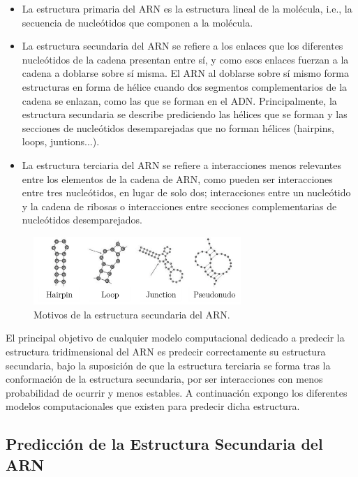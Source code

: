 \documentclass[a4paper,11pt,titlepage]{article}
\theoremstyle{definition}
\begin{document}
\begin{itemize}
    \item La estructura primaria del ARN es la estructura lineal de la molécula, i.e., la secuencia de nucleótidos que componen a la molécula.
    \item La estructura secundaria del ARN se refiere a los enlaces que los diferentes nucleótidos de la cadena presentan entre sí, y como esos enlaces fuerzan a la cadena a doblarse sobre sí misma. El ARN al doblarse sobre sí mismo forma estructuras en forma de hélice cuando dos segmentos complementarios de la cadena se enlazan, como las que se forman en el ADN. Principalmente, la estructura secundaria se describe prediciendo las hélices que se forman y las secciones de nucleótidos desemparejadas que no forman hélices (hairpins, loops, juntions...).
    \item La estructura terciaria del ARN se refiere a interacciones menos relevantes entre los elementos de la cadena de ARN, como pueden ser interacciones entre tres nucleótidos, en lugar de solo dos; interacciones entre un nucleótido y la cadena de ribosas o interacciones entre secciones complementarias de nucleótidos desemparejados.
\end{itemize}

\begin{figure}[H]
    \centering
    \includegraphics[width=0.70\textwidth]{images/RNA_secondary_structure.png}
    \small{\caption{Motivos de la estructura secundaria del ARN.}\label{fig:RNA_secondary_structure}}\normalsize
\end{figure}

El principal objetivo de cualquier modelo computacional dedicado a predecir la estructura tridimensional del ARN es predecir correctamente su estructura secundaria, bajo la suposición de que la estructura terciaria se forma tras la conformación de la estructura secundaria, por ser interacciones con menos probabilidad de ocurrir y menos estables. A continuación expongo los diferentes modelos computacionales que existen para predecir dicha estructura.

\subsection{Predicción de la Estructura Secundaria del ARN}\label{subsubsec:thbasis}
\end{document}
